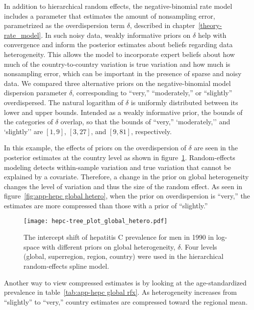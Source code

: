In addition to hierarchical random effects, the negative-binomial
rate model includes a parameter that estimates
the amount of nonsampling error, parametrized as the overdispersion
term $\delta$, described in chapter~\ref{theory-rate_model}.
In such noisy data, weakly informative priors on $\delta$ help with
convergence and inform the posterior estimates about beliefs
regarding data heterogeneity.  This allows the model to incorporate
expert beliefs about how much of the country-to-country variation is
true variation and how much is nonsampling error, which can be
important in the presence of sparse and noisy data.  We compared three
alternative priors on the negative-binomial model dispersion
parameter $\delta$, corresponding to ``very,'' ``moderately,'' or
``slightly'' overdispersed.  The natural logarithm of $\delta$ is
uniformly distributed between its lower and upper bounds.  Intended as
a weakly informative prior, the bounds of the categories of $\delta$ overlap, so
that the bounds of ``very,'' `moderately,'' and `slightly'' are $[1,9]$, $[3,27]$, and
$[9,81]$, respectively.

In this example, the effects of priors on the overdispersion of
$\delta$ are seen in the posterior estimates at the country level as
shown in figure~\ref{fig:app-hepc global hetero}.  Random-effects
modeling detects within-sample variation and true variation that
cannot be explained by a covariate.  Therefore, a change in the prior
on global heterogeneity changes the level of variation and thus the
size of the random effect.  As seen in figure~\ref{fig:app-hepc global
  hetero}, when the prior on overdispersion is ``very,'' the estimates
are more compressed than those with a prior of ``slightly.''

    \begin{figure}[h]
        \begin{center}
            \texttt{[image: hepc-tree\_plot\_global\_hetero.pdf]}
            \caption{The intercept shift of hepatitis C
              prevalence for men in 1990 in log-space with different priors on
              global heterogeneity, $\delta$.  Four levels (global,
              superregion, region, country) were used in the
              hierarchical random-effects spline model.}
            \label{fig:app-hepc global hetero}
        \end{center}
    \end{figure}

Another way to view compressed estimates is by looking at the
age-standardized prevalence in table~\ref{tab:app-hepc global rfx}.
As heterogeneity increases from ``slightly'' to ``very,'' country
estimates are compressed toward the regional mean.

